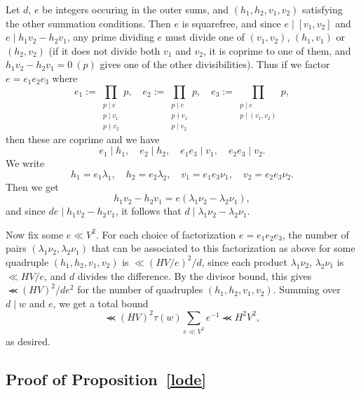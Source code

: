 \documentclass[12pt,a4paper,reqno]{amsart}
\numberwithin{equation}{section}
\theoremstyle{plain}
\theoremstyle{definition}
\renewcommand{\lessapprox}{\llcurly}
\begin{document}
Let $d$, $e$ be integers occuring in the outer sums, and
$(h_1,h_2,v_1,v_2)$ satisfying the other summation conditions. Then
$e$ is squarefree, and since $e\mid [v_1,v_2]$ and $e\mid
h_1v_2-h_2v_1$, any prime dividing $e$ must divide one of $(v_1,v_2)$,
$(h_1,v_1)$ or $(h_2,v_2)$ (if it does not divide both $v_1$ and
$v_2$, it is coprime to one of them, and $h_1v_2-h_2v_1=0\ (p)$ gives
one of the other divisibilities). Thus if we factor $e=e_1e_2e_3$
where
$$
e_1:=\prod_{\substack{p\mid e\\p\mid v_1\\p\nmid v_2}}p,\quad
e_2:=\prod_{\substack{p\mid e\\p\nmid v_1\\p\mid v_2}}p,\quad
e_3:=\prod_{\substack{p\mid e\\p\mid (v_1,v_2)}}p,
$$
then these are coprime and we have
$$
e_1\mid h_1,\quad e_2\mid h_2,\quad e_1e_3\mid v_1,\quad
e_2e_3\mid v_2.
$$
We write
$$
h_1=e_1\lambda_1,\quad h_2=e_2\lambda_2,\quad 
v_1=e_1e_3\nu_1,\quad v_2=e_2e_3\nu_2.
$$
Then we get
$$
h_1v_2-h_2v_1=e(\lambda_1\nu_2-\lambda_2\nu_1),
$$
and since $de\mid h_1v_2-h_2v_1$, it follows that $d\mid
\lambda_1\nu_2-\lambda_2\nu_1$. 
\par
Now fix some $e\ll V^2$. For each choice of factorization
$e=e_1e_2e_3$, the number of pairs $(\lambda_1\nu_2,\lambda_2\nu_1)$
that can be associated to this factorization as above for some
quadruple $(h_1,h_2,v_1,v_2)$ is $\ll (HV/e)^2/d$, since each product
$\lambda_1\nu_2$, $\lambda_2\nu_1$ is $\ll HV/e$, and $d$ divides the
difference. By the divisor bound, this gives $\lessapprox (HV)^2/de^2$
for the number of quadruples $(h_1,h_2,v_1,v_2)$. Summing over $d\mid
w$ and $e$, we get a total bound
$$
\lessapprox (HV)^2\tau(w)\sum_{e\ll V^2}e^{-1}\lessapprox H^2V^2,
$$
as desired.

\subsection{Proof of Proposition~\ref{lode}}\label{sec-final-exp}
\end{document}
